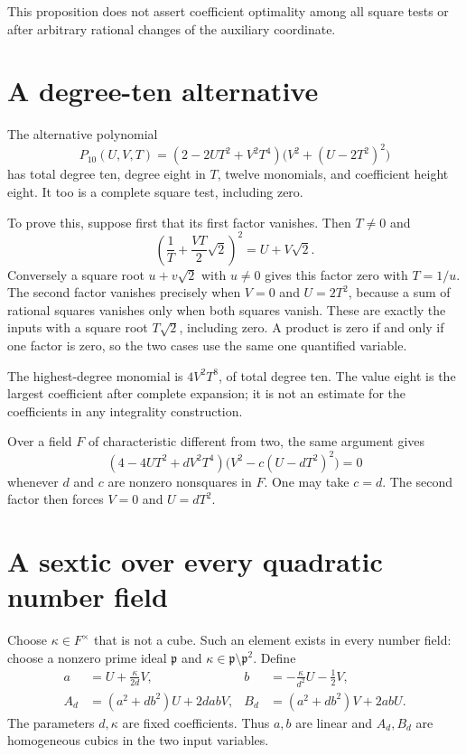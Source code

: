 \documentclass[11pt,a4paper]{article}
\begin{document}
This proposition does not assert coefficient optimality among
all square tests or after arbitrary rational changes of the
auxiliary coordinate.

\section{A degree-ten alternative}\label{sec:ten}

The alternative polynomial
\begin{equation}\label{eq:P10}
 P_{10}(U,V,T)
   =(2-2UT^2+V^2T^4)\bigl(V^2+(U-2T^2)^2\bigr)
\end{equation}
has total degree ten, degree eight in $T$, twelve monomials, and
coefficient height eight. It too is a complete square test, including zero.

To prove this, suppose first that its first factor vanishes. Then $T\ne0$
and
\[
       \left(\frac1T+\frac{VT}{2}\sqrt2\right)^2=U+V\sqrt2.
\]
Conversely a square root $u+v\sqrt2$ with $u\ne0$ gives this factor
zero with $T=1/u$. The second factor vanishes precisely when
$V=0$ and $U=2T^2$, because a sum of rational squares vanishes only
when both squares vanish. These are exactly the inputs with a square
root $T\sqrt2$, including zero. A product is zero if and only if one
factor is zero, so the two cases use the same one quantified variable.

The highest-degree monomial is $4V^2T^8$, of total degree ten.
The value eight is the largest coefficient after complete expansion;
it is not an estimate for the coefficients in any integrality construction.

Over a field $F$ of characteristic different from two, the same
argument gives
\begin{equation}\label{eq:general10}
 (4-4UT^2+dV^2T^4)\bigl(V^2-c(U-dT^2)^2\bigr)=0
\end{equation}
whenever $d$ and $c$ are nonzero nonsquares in $F$. One may take $c=d$.
The second factor then forces $V=0$ and $U=dT^2$.

\section{A sextic over every quadratic number field}\label{sec:general}

Choose $\kappa\in F^\times$ that is not a cube. Such an element exists
in every number field: choose a nonzero prime ideal $\mathfrak p$ and
$\kappa\in\mathfrak p\setminus\mathfrak p^2$.
Define
\begin{align}
 a&=U+\frac{\kappa}{2d}V,
 &b&=-\frac{\kappa}{d^2}U-\frac12V,\label{eq:generalab}\\
 A_d&=(a^2+db^2)U+2dabV,
 &B_d&=(a^2+db^2)V+2abU.\label{eq:generalAB}
\end{align}
The parameters $d,\kappa$ are fixed coefficients. Thus $a,b$ are linear
and $A_d,B_d$ are homogeneous cubics in the two input variables.
\end{document}
